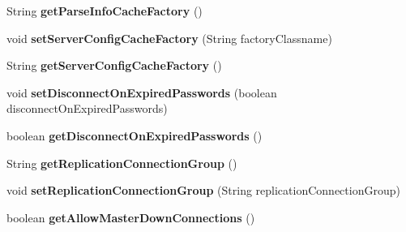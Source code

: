 \begin{DoxyCompactItemize}
String {\bfseries get\+Parse\+Info\+Cache\+Factory} ()
\item 
\mbox{\label{classcom_1_1mysql_1_1jdbc_1_1_connection_properties_impl_a3e387c000047307eed2a5f7d0daca1df}} 
void {\bfseries set\+Server\+Config\+Cache\+Factory} (String factory\+Classname)
\item 
\mbox{\label{classcom_1_1mysql_1_1jdbc_1_1_connection_properties_impl_a7b10745c708b6dae1ab25a986ed6e431}} 
String {\bfseries get\+Server\+Config\+Cache\+Factory} ()
\item 
\mbox{\label{classcom_1_1mysql_1_1jdbc_1_1_connection_properties_impl_afaaa9e577d739ab96fb4e9b3973590be}} 
void {\bfseries set\+Disconnect\+On\+Expired\+Passwords} (boolean disconnect\+On\+Expired\+Passwords)
\item 
\mbox{\label{classcom_1_1mysql_1_1jdbc_1_1_connection_properties_impl_a2c864f9040528b05fb044cfa0e29c2d7}} 
boolean {\bfseries get\+Disconnect\+On\+Expired\+Passwords} ()
\item 
\mbox{\label{classcom_1_1mysql_1_1jdbc_1_1_connection_properties_impl_a937e98a34bff7a2ab116e0f2907b78e1}} 
String {\bfseries get\+Replication\+Connection\+Group} ()
\item 
\mbox{\label{classcom_1_1mysql_1_1jdbc_1_1_connection_properties_impl_a35d8bca0509be8a85401b2e441d6e27a}} 
void {\bfseries set\+Replication\+Connection\+Group} (String replication\+Connection\+Group)
\item 
\mbox{\label{classcom_1_1mysql_1_1jdbc_1_1_connection_properties_impl_a71ec698b600df7ee932b2516f8730905}} 
boolean {\bfseries get\+Allow\+Master\+Down\+Connections} ()
\item 
\mbox{\label{classcom_1_1mysql_1_1jdbc_1_1_connection_properties_impl_a708b5171928c62310f16634d006336f1}} 

\end{DoxyCompactItemize}
